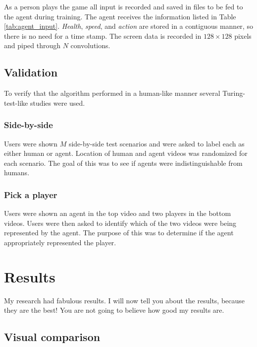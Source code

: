 \documentclass[12pt]{thesis}
\begin{document}
As a person plays the game all input is recorded and saved in files to be fed 
to the agent during training. The agent receives the information listed in 
Table \ref{tab:agent_input}. \textit{Health}, \textit{speed}, and 
\textit{action} are stored in a contiguous manner, so there is no need for a 
time stamp. 
The screen data is recorded in $128 \times 128$ pixels and piped through 
$N$ convolutions. 

\section{Validation}
To verify that the algorithm performed in a human-like manner several 
Turing-test-like studies were used. 

\subsection{Side-by-side}
Users were shown $M$ side-by-side test scenarios and were asked to label each 
as either human or agent. Location of human and agent videos was randomized for 
each scenario. The goal of this was to see if agents were indistinguishable 
from humans.

\subsection{Pick a player}
Users were shown an agent in the top video and two players in the bottom videos. 
Users were then asked to identify which of the two videos were being 
represented by the agent. The purpose of this was to determine if the agent 
appropriately represented the player.



\chapter{Results}
My research had fabulous results. I will now tell you about
the results, because they are the best!  You are not going
to believe how good my results are.

\section{Visual comparison}
\end{document}
